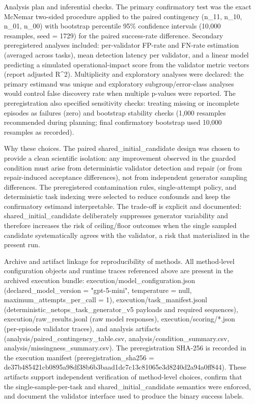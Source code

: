 \documentclass[conference]{IEEEtran}
\begin{document}
Analysis plan and inferential checks. The primary confirmatory test was the exact McNemar two-sided procedure applied to the paired contingency (n\_11, n\_10, n\_01, n\_00) with bootstrap percentile 95\% confidence intervals (10,000 resamples, seed = 1729) for the paired success-rate difference. Secondary preregistered analyses included: per-validator FP-rate and FN-rate estimation (averaged across tasks), mean detection latency per validator, and a linear model predicting a simulated operational-impact score from the validator metric vectors (report adjusted R\textasciicircum{}2). Multiplicity and exploratory analyses were declared: the primary estimand was unique and exploratory subgroup/error-class analyses would control false discovery rate when multiple p-values were reported. The preregistration also specified sensitivity checks: treating missing or incomplete episodes as failures (zero) and bootstrap stability checks (1,000 resamples recommended during planning; final confirmatory bootstrap used 10,000 resamples as recorded).

Why these choices. The paired shared\_initial\_candidate design was chosen to provide a clean scientific isolation: any improvement observed in the guarded condition must arise from deterministic validator detection and repair (or from repair-induced acceptance differences), not from independent generator sampling differences. The preregistered contamination rules, single-attempt policy, and deterministic task indexing were selected to reduce confounds and keep the confirmatory estimand interpretable. The trade-off is explicit and documented: shared\_initial\_candidate deliberately suppresses generator variability and therefore increases the risk of ceiling/floor outcomes when the single sampled candidate systematically agrees with the validator, a risk that materialized in the present run.

Archive and artifact linkage for reproducibility of methods. All method-level configuration objects and runtime traces referenced above are present in the archived execution bundle: execution/model\_configuration.json (declared\_model\_version = "gpt-5-mini", temperature = null, maximum\_attempts\_per\_call = 1), execution/task\_manifest.jsonl (deterministic\_netops\_task\_generator\_v5 payloads and required sequences), execution/raw\_results.jsonl (raw model responses), execution/scoring/*.json (per-episode validator traces), and analysis artifacts (analysis/paired\_contingency\_table.csv, analysis/condition\_summary.csv, analysis/missingness\_summary.csv). The preregistration SHA-256 is recorded in the execution manifest (preregistration\_sha256 = de37b485\allowbreak{}421cb089\allowbreak{}5a98df38\allowbreak{}b6b3baad\allowbreak{}1dc7c13c\allowbreak{}81065e3d\allowbreak{}8240d2a9\allowbreak{}4a0ff844). These artifacts support independent verification of method-level choices, confirm that the single-sample-per-task and shared\_initial\_candidate semantics were enforced, and document the validator interface used to produce the binary success labels.
\end{document}
